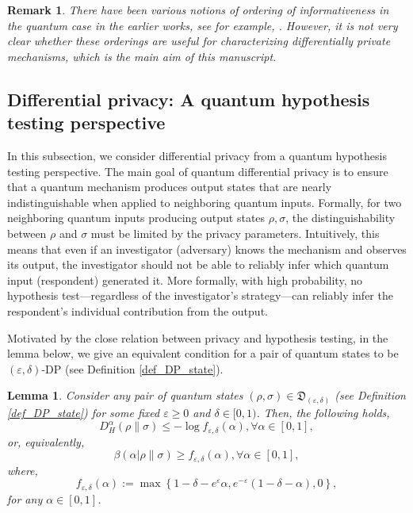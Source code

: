 \documentclass[onecolumn,ldraftcls, 11pt]{IEEEtran}
\newcommand{\eps}{\varepsilon}
\newtheorem{remark}{Remark}
\newtheorem{lemma}{Lemma}
\begin{document}
\begin{remark}
    There have been various notions of ordering of informativeness in the quantum case in the earlier works, see for example,  \cite{ReebKastoryanoWolf2011,Buscemi2012,Jencova2012,Matsumoto:2015vgh,Buscemi2016,Buscemi_2018,BuscemiSutterTomamichel2019,WW19}. However, it is not very clear whether these orderings are useful for characterizing differentially private mechanisms, which is the main aim of this manuscript.
\end{remark}

\subsection{Differential privacy: A quantum hypothesis testing perspective}

In this subsection, we consider differential privacy from a quantum hypothesis testing perspective. The main goal of quantum differential privacy is to ensure that a quantum mechanism produces output states that are nearly indistinguishable when applied to neighboring quantum inputs. Formally, for two neighboring quantum inputs producing output states $\rho, \sigma$, the distinguishability between $\rho$ and $\sigma$ must be limited by the privacy parameters. Intuitively, this means that even if an investigator (adversary) knows the mechanism and observes its output, the investigator should not be able to reliably infer which quantum input (respondent) generated it. More formally, with high probability, no hypothesis test—regardless of the investigator’s strategy—can reliably infer the respondent’s individual contribution from the output.

Motivated by the close relation between privacy and hypothesis testing, in the lemma below, we give an equivalent condition for a pair of quantum states to be $(\eps,\delta)$-DP (see Definition \ref{def_DP_state}). 


\begin{lemma}\label{lemma_DP_t_hyp_rel}
    Consider any pair of quantum states $(\rho,\sigma) \in \mathfrak{D}_{(\eps,\delta)} $ (see Definition \ref{def_DP_state}) for some fixed $\eps \geq 0$ and $\delta \in [0,1)$. Then, the following holds,
\begin{equation}
    D^{\alpha}_{H} {(\rho\|\sigma)} \leq -\log f_{\eps,\delta}(\alpha), \forall \alpha \in [0,1], \label{lemma_DP_t_hyp_rel_eq}
\end{equation}
or, equivalently,
\begin{equation}
    \beta(\alpha|\rho\|\sigma) \geq  f_{\eps,\delta}(\alpha), \forall \alpha \in [0,1], \label{lemma_DP_t_hyp_rel_eq1}
\end{equation}
where,
\begin{equation}
    f_{\eps,\delta}(\alpha) := \max\left\{1 - \delta - e^{\eps}\alpha, e^{-\eps}(1 -\delta-\alpha),0\right\},\label{fepdel}
\end{equation}
 for any $\alpha \in [0,1]$.
\end{lemma}
\end{document}
